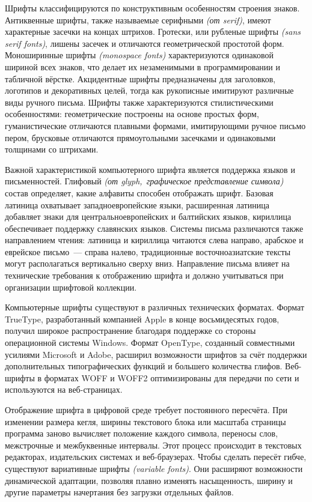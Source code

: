 Шрифты классифицируются по конструктивным особенностям строения знаков. Антиквенные шрифты, также называемые серифными \textit{(от serif)}, имеют характерные засечки на концах штрихов. Гротески, или рубленые шрифты \textit{(sans serif fonts)}, лишены засечек и отличаются геометрической простотой форм. Моноширинные шрифты \textit{(monospace fonts)} характеризуются одинаковой шириной всех знаков, что делает их незаменимыми в программировании и табличной вёрстке. Акцидентные шрифты предназначены для заголовков, логотипов и декоративных целей, тогда как рукописные имитируют различные виды ручного письма. Шрифты также характеризуются стилистическими особенностями: геометрические построены на основе простых форм, гуманистические отличаются плавными формами, имитирующими ручное письмо пером, брусковые отличаются прямоугольными засечками и одинаковыми толщинами со штрихами.

Важной характеристикой компьютерного шрифта является поддержка языков и письменностей. Глифовый \textit{(от glyph,~графическое представление символа)} состав определяет, какие алфавиты способен отображать шрифт. Базовая латиница охватывает западноевропейские языки, расширенная латиница добавляет знаки для центральноевропейских и балтийских языков, кириллица обеспечивает поддержку славянских языков. Системы письма различаются также направлением чтения: латиница и кириллица читаются слева направо, арабское и еврейское письмо~--- справа налево, традиционные восточноазиатские тексты могут располагаться вертикально сверху вниз. Направление письма влияет на технические требования к отображению шрифта и должно учитываться при организации шрифтовой коллекции.

Компьютерные шрифты существуют в различных технических форматах. Формат TrueType, разработанный компанией Apple в конце восьмидесятых годов, получил широкое распространение благодаря поддержке со стороны операционной системы Windows. Формат OpenType, созданный совместными усилиями Microsoft и Adobe, расширил возможности шрифтов за счёт поддержки дополнительных типографических функций и большего количества глифов. Веб-шрифты в форматах WOFF и WOFF2 оптимизированы для передачи по сети и используются на веб-страницах.

Отображение шрифта в цифровой среде требует постоянного пересчёта. При изменении размера кегля, ширины текстового блока или масштаба страницы программа заново вычисляет положение каждого символа, переносы слов, межстрочные и межбуквенные интервалы. Этот процесс происходит в текстовых редакторах, издательских системах и веб-браузерах. Чтобы сделать пересёт гибче, существуют вариативные шрифты \textit{(variable fonts)}. Они расширяют возможности динамической адаптации, позволяя плавно изменять насыщенность, ширину и другие параметры начертания без загрузки отдельных файлов.

